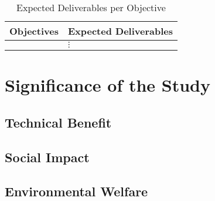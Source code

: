 \begin{table}[!htbp]
	\caption{Expected Deliverables per Objective} 	
	\label{tab:expected_deliverables} 
	{\centering \scriptsize
		\begin{tabular}{p{}|p{}}
			\hline 
			\hline 
			\textbf{Objectives} & 
			\textbf{Expected Deliverables}\\ 
			\hline 

			\Paste{GO} & $\vdots$ \\ \hline

%
%						
%						
%						
%			
		\end{tabular}
	}
\end{table}



\section{Significance of the Study}

\graytx{\blindtext}

\subsection{Technical Benefit}


\subsection{Social Impact}


\subsection{Environmental Welfare}

